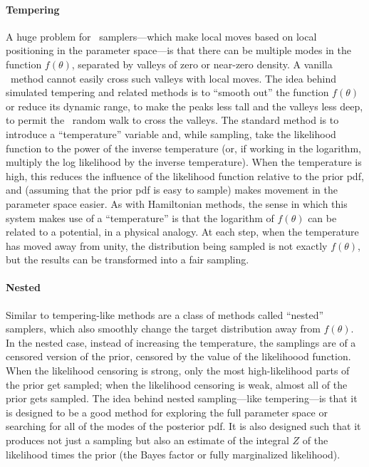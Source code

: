 \documentclass[modern]{aastex61}
\newcommand{\MCMC}{\acronym{MCMC}}
\newcommand{\pars}{\theta}
\begin{document}
\paragraph{Tempering}
A huge problem for \MCMC\ samplers---which make local moves based on
local positioning in the parameter space---is that there can be
multiple modes in the function $f(\pars)$, separated by valleys of
zero or near-zero density.
A vanilla \MCMC\ method cannot easily cross such valleys with local
moves.
The idea behind simulated tempering and related methods is to ``smooth
out'' the function $f(\pars)$ or reduce its dynamic range, to make the
peaks less tall and the valleys less deep, to permit the \MCMC\ random
walk to cross the valleys.
The standard method is to introduce a ``temperature'' variable and,
while sampling, take the likelihood function to the power of the
inverse temperature (or, if working in the logarithm, multiply the log
likelihood by the inverse temperature).
When the temperature is high, this reduces the influence of the
likelihood function relative to the prior pdf, and (assuming that the
prior pdf is easy to sample) makes movement in the parameter space
easier.
As with Hamiltonian methods, the sense in which this system makes use
  of a ``temperature''
  is that the logarithm of $f(\pars)$ can be related to a potential,
  in a physical analogy.
At each step, when the temperature has moved away from unity, the
distribution being sampled is not exactly $f(\pars)$, but the results
can be transformed into a fair sampling.

\paragraph{Nested}
Similar to tempering-like methods are a class of methods called ``nested''
samplers,
which also smoothly change the target distribution away from $f(\pars)$.
In the nested case, instead of increasing the temperature, the
samplings are of a censored version of the prior, censored by the
value of the likelihoood function.
When the likelihood censoring is strong, only the most high-likelihood
parts of the prior get sampled; when the likelihood censoring is weak,
almost all of the prior gets sampled.
The idea behind nested sampling---like tempering---is that it is
designed to be a good method for exploring the full parameter space or
searching for all of the modes of the posterior pdf.
It is also designed such that it produces not just a sampling but also
an estimate of the integral $Z$ of the likelihood times the prior
(the Bayes factor or fully marginalized likelihood).
\end{document}

